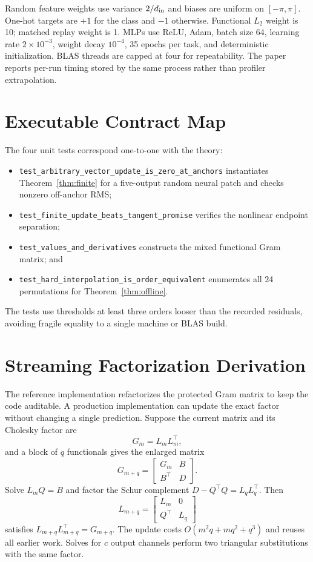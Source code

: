 \documentclass{vanish_ieee}
\theoremstyle{definition}
\begin{document}
Random feature weights use variance $2/d_{\rm in}$ and biases are uniform on $[-\pi,\pi]$.  One-hot targets are $+1$ for the class and $-1$ otherwise.  Functional $L_2$ weight is 10; matched replay weight is 1.  MLPs use ReLU, Adam, batch size 64, learning rate $2\times10^{-3}$, weight decay $10^{-4}$, 35 epochs per task, and deterministic initialization.  BLAS threads are capped at four for repeatability.  The paper reports per-run timing stored by the same process rather than profiler extrapolation.

\section{Executable Contract Map}

The four unit tests correspond one-to-one with the theory:
\begin{itemize}
  \item \texttt{test\_arbitrary\_vector\_update\_is\_zero\_at\_anchors} instantiates Theorem~\ref{thm:finite} for a five-output random neural patch and checks nonzero off-anchor RMS;
  \item \texttt{test\_finite\_update\_beats\_tangent\_promise} verifies the nonlinear endpoint separation;
  \item \texttt{test\_values\_and\_derivatives} constructs the mixed functional Gram matrix; and
  \item \texttt{test\_hard\_interpolation\_is\_order\_equivalent} enumerates all 24 permutations for Theorem~\ref{thm:offline}.
\end{itemize}
The tests use thresholds at least three orders looser than the recorded residuals, avoiding fragile equality to a single machine or BLAS build.

\section{Streaming Factorization Derivation}

The reference implementation refactorizes the protected Gram matrix to keep the code auditable.  A production implementation can update the exact factor without changing a single prediction.  Suppose the current matrix and its Cholesky factor are
\begin{equation}
G_m=L_mL_m^\top,
\end{equation}
and a block of $q$ functionals gives the enlarged matrix
\begin{equation}
G_{m+q}=\begin{bmatrix}G_m&B\\B^\top&D\end{bmatrix}.
\end{equation}
Solve $L_mQ=B$ and factor the Schur complement $D-Q^\top Q=L_qL_q^\top$.  Then
\begin{equation}
L_{m+q}=\begin{bmatrix}L_m&0\\Q^\top&L_q\end{bmatrix}
\end{equation}
satisfies $L_{m+q}L_{m+q}^\top=G_{m+q}$.  The update costs $O(m^2q+mq^2+q^3)$ and reuses all earlier work.  Solves for $c$ output channels perform two triangular substitutions with the same factor.
\end{document}
